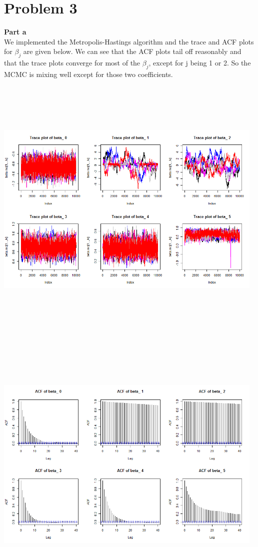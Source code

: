\documentclass[10pt,a4paper]{article}
\begin{document}
\section*{Problem 3}
\textbf{Part a}\\
We implemented the Metropolis-Hastings algorithm and the trace and ACF plots for $\beta_j$ are given below. We can see that the ACF plots tail off reasonably and that the trace plots converge for most of the $\beta_j$, except for j being 1 or 2. So the MCMC is mixing well except for those two coefficients.  \\
\centerline{\includegraphics[width=13cm,height=13cm,keepaspectratio]{./images/Prob31}}
\centerline{\includegraphics[width=13cm,height=13cm,keepaspectratio]{./images/Prob32}}
\end{document}
